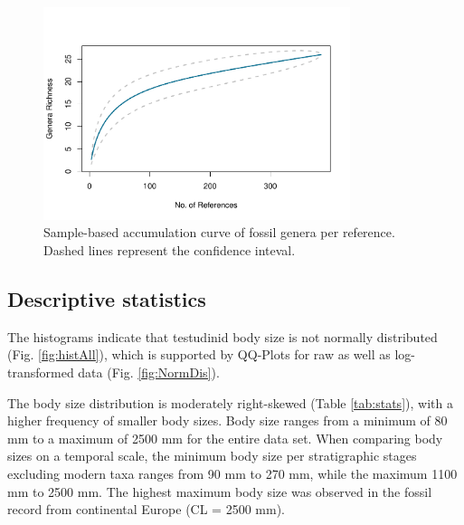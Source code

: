 \begin{figure}[htbp]
	\centering
	\includegraphics[width=0.8\textwidth]{MA_JJ_files/figure-latex/SACGenera-1.pdf}
	\caption[Sample-based accumulation curve on generic level]{Sample-based accumulation curve of fossil genera per reference. Dashed lines represent the confidence inteval.}
	\label{fig:SACGen}
\end{figure}


\FloatBarrier



\subsection{Descriptive statistics}

The histograms indicate that testudinid body size is not normally distributed (Fig. \ref{fig:histAll}), which is supported by QQ-Plots for raw as well as log-transformed data (Fig. \ref{fig:NormDis}).

The body size distribution is moderately right-skewed (Table \ref{tab:stats}), with a higher frequency of smaller body sizes.
Body size ranges from a minimum of 80 mm to a maximum of 2500 mm for the entire data set. When comparing body sizes on a temporal scale, the minimum body size per stratigraphic stages excluding modern taxa ranges from 90 mm to 270 mm, while the maximum 1100 mm to 2500 mm. The highest maximum body size was observed in the fossil record from continental Europe (CL = 2500 mm).

